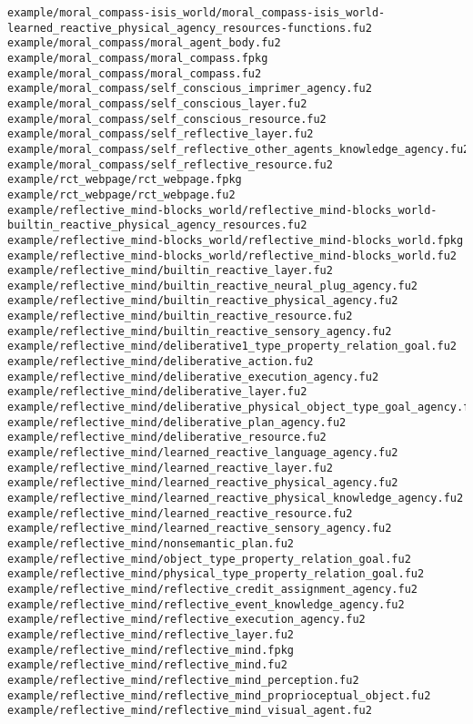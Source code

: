 \begin{lstlisting}
example/moral_compass-isis_world/moral_compass-isis_world-learned_reactive_physical_agency_resources-functions.fu2
example/moral_compass/moral_agent_body.fu2
example/moral_compass/moral_compass.fpkg
example/moral_compass/moral_compass.fu2
example/moral_compass/self_conscious_imprimer_agency.fu2
example/moral_compass/self_conscious_layer.fu2
example/moral_compass/self_conscious_resource.fu2
example/moral_compass/self_reflective_layer.fu2
example/moral_compass/self_reflective_other_agents_knowledge_agency.fu2
example/moral_compass/self_reflective_resource.fu2
example/rct_webpage/rct_webpage.fpkg
example/rct_webpage/rct_webpage.fu2
example/reflective_mind-blocks_world/reflective_mind-blocks_world-builtin_reactive_physical_agency_resources.fu2
example/reflective_mind-blocks_world/reflective_mind-blocks_world.fpkg
example/reflective_mind-blocks_world/reflective_mind-blocks_world.fu2
example/reflective_mind/builtin_reactive_layer.fu2
example/reflective_mind/builtin_reactive_neural_plug_agency.fu2
example/reflective_mind/builtin_reactive_physical_agency.fu2
example/reflective_mind/builtin_reactive_resource.fu2
example/reflective_mind/builtin_reactive_sensory_agency.fu2
example/reflective_mind/deliberative1_type_property_relation_goal.fu2
example/reflective_mind/deliberative_action.fu2
example/reflective_mind/deliberative_execution_agency.fu2
example/reflective_mind/deliberative_layer.fu2
example/reflective_mind/deliberative_physical_object_type_goal_agency.fu2
example/reflective_mind/deliberative_plan_agency.fu2
example/reflective_mind/deliberative_resource.fu2
example/reflective_mind/learned_reactive_language_agency.fu2
example/reflective_mind/learned_reactive_layer.fu2
example/reflective_mind/learned_reactive_physical_agency.fu2
example/reflective_mind/learned_reactive_physical_knowledge_agency.fu2
example/reflective_mind/learned_reactive_resource.fu2
example/reflective_mind/learned_reactive_sensory_agency.fu2
example/reflective_mind/nonsemantic_plan.fu2
example/reflective_mind/object_type_property_relation_goal.fu2
example/reflective_mind/physical_type_property_relation_goal.fu2
example/reflective_mind/reflective_credit_assignment_agency.fu2
example/reflective_mind/reflective_event_knowledge_agency.fu2
example/reflective_mind/reflective_execution_agency.fu2
example/reflective_mind/reflective_layer.fu2
example/reflective_mind/reflective_mind.fpkg
example/reflective_mind/reflective_mind.fu2
example/reflective_mind/reflective_mind_perception.fu2
example/reflective_mind/reflective_mind_proprioceptual_object.fu2
example/reflective_mind/reflective_mind_visual_agent.fu2

\end{lstlisting}
